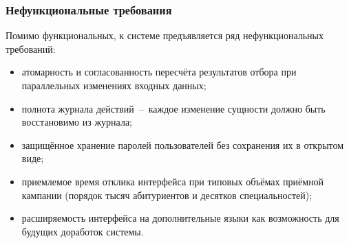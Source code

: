 \subsubsection{Нефункциональные требования}

Помимо функциональных, к системе предъявляется ряд нефункциональных требований:
\begin{itemize}
\item атомарность и согласованность пересчёта результатов отбора при параллельных изменениях входных данных;
\item полнота журнала действий~--~каждое изменение сущности должно быть восстановимо из журнала;
\item защищённое хранение паролей пользователей без сохранения их в открытом виде;
\item приемлемое время отклика интерфейса при типовых объёмах приёмной кампании (порядок тысяч абитуриентов и десятков специальностей);
\item расширяемость интерфейса на дополнительные языки как возможность для будущих доработок системы.
\end{itemize}
